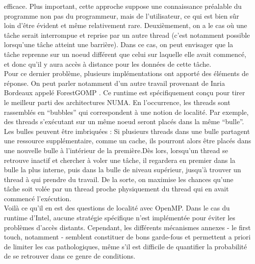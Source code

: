 \documentclass{report}
\begin{document}
efficace. Plus important, cette approche suppose une connaissance préalable du programme non pas
du programmeur, mais de l'utilisateur, ce qui est bien sûr loin d'être évident et même relativement
rare. Deuxièmement, on a le cas où une tâche serait interrompue et reprise par un autre thread (c'est
notamment possible lorsqu'une tâche atteint une barrière). Dans ce cas, on peut envisager que la tâche
reprenne sur un noeud différent que celui sur laquelle elle avait commencé, et donc qu'il y aura accès 
à distance pour les données de cette tâche.
\\Pour ce dernier problème, plusieurs implémentations ont apporté des éléments de réponse. On peut
parler notamment d'un autre travail provenant de Inria Bordeaux appelé ForestGOMP \cite{forest}. Ce runtime
est spécifiquement conçu pour tirer le meilleur parti des architectures NUMA. En l'occurrence, les threads
sont rassemblés en ``bubbles'' qui correspondent à une notion de localité. Par exemple, des threads 
s'exécutant sur un même noeud seront placés dans la même ``bulle''. Les bulles peuvent être imbriquées : 
Si plusieurs threads dans une bulle partagent une ressource supplémentaire, comme un cache, ils pourront
alors être placés dans une nouvelle bulle à l'intérieur de la première.Dès lors, lorsqu'un thread se 
retrouve inactif et chercher à voler une tâche, il regardera en premier dans la bulle la plus interne,
puis dans la bulle de niveau supérieur, jusqu'à trouver un thread à qui prendre du travail. De la sorte,
on maximise les chances qu'une tâche soit volée par un thread proche physiquement du thread qui en avait
commencé l'exécution.
\\Voilà ce qu'il en est des questions de localité avec OpenMP. Dans le cas du runtime d'Intel, aucune 
stratégie spécifique n'est implémentée pour éviter les problèmes d'accès distants. Cependant, les différents
mécanismes annexes - le first touch, notamment - semblent constituer de bons garde-fous et permettent
a priori de limiter les cas pathologiques, même s'il est difficile de quantifier la probabilité de se
retrouver dans ce genre de conditions. 
\end{document}
